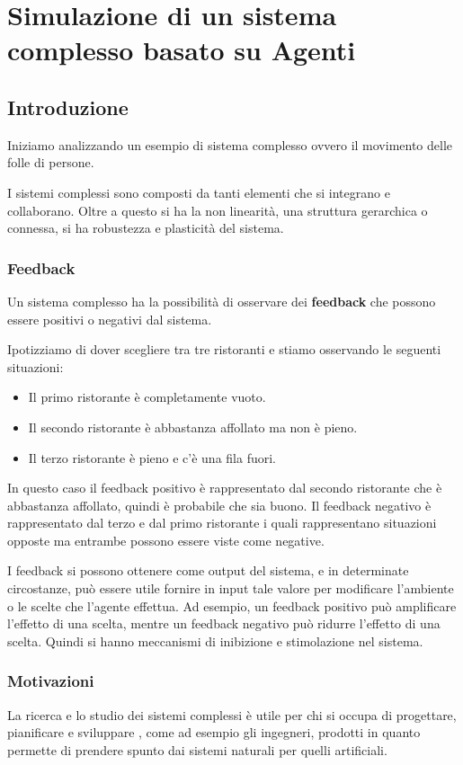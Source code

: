 \chapter{Simulazione di un sistema complesso basato su Agenti}
\section{Introduzione}
Iniziamo analizzando un esempio di sistema complesso ovvero il movimento delle
folle di persone.

I sistemi complessi sono composti da tanti elementi che si integrano e collaborano.
Oltre a questo si ha la non linearità, una struttura gerarchica o connessa, si
ha robustezza e plasticità del sistema.
\subsection{Feedback}
Un sistema complesso ha la possibilità di osservare dei \textbf{feedback} che
possono essere positivi o negativi dal sistema.
\begin{esempio}
      Ipotizziamo di dover scegliere tra tre ristoranti e stiamo osservando
      le seguenti situazioni:
      \begin{itemize}
            \item Il primo ristorante è completamente vuoto.
            \item Il secondo ristorante è abbastanza affollato ma non è pieno.
            \item Il terzo ristorante è pieno e c'è una fila fuori.
      \end{itemize}
      In questo caso il feedback positivo è rappresentato dal secondo ristorante
      che è abbastanza affollato, quindi è probabile che sia buono. Il feedback
      negativo è rappresentato dal terzo e dal primo ristorante i quali
      rappresentano situazioni opposte ma entrambe possono essere viste come
      negative.
\end{esempio}
I feedback si possono ottenere come output del sistema, e in determinate circostanze,
può essere utile fornire in input tale valore per modificare l'ambiente o le
scelte che l'agente effettua. Ad esempio, un feedback positivo può amplificare
l'effetto di una scelta, mentre un feedback negativo può ridurre l'effetto di
una scelta. Quindi si hanno meccanismi di inibizione e stimolazione nel sistema.
\subsection{Motivazioni}
La ricerca e lo studio dei sistemi complessi è utile per chi si occupa di progettare,
pianificare e sviluppare , come ad esempio gli ingegneri, prodotti in quanto
permette di prendere spunto dai sistemi naturali per quelli artificiali.

